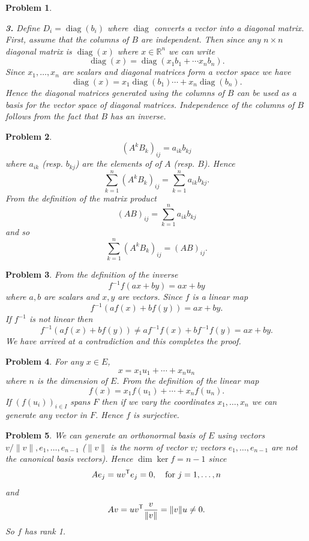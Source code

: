 \documentclass{article}
\newcommand{\subno}[1]{\par\noindent\textbf{#1}}
\theoremstyle{pprop}
\newtheorem{problem}{Problem}[section]
\begin{document}
\begin{problem}
$$$$
\subno{3.} Define $D_i=\operatorname*{diag}(b_i)$ where $\operatorname*{diag}$ converts a vector into a diagonal matrix. 
First, assume that the columns of $B$ are independent. Then since any $n \times n$ diagonal matrix is $\operatorname*{diag}(x)$ 
where $x \in \mathbb{R}^n$ we can write 
$$
\operatorname*{diag}(x)=
\operatorname*{diag}(x_1b_1 + \cdots x_n b_n).
$$
Since $x_1,\ldots,x_n$ are scalars and diagonal matrices form a vector space we have
$$
\operatorname*{diag}(x)=
x_1\operatorname*{diag}(b_1)
\cdots +  x_n \operatorname*{diag}(b_n).
$$
Hence the diagonal matrices generated using the columns of $B$ can be used as a basis for the vector space of diagonal matrices. 
Independence of the columns of $B$ follows from the fact that $B$ has an inverse.
\end{problem}
\begin{problem}
$$
(A^kB_k)_{ij}= a_{ik} b_{kj} 
$$
where $a_{ik}$ (resp. $b_{kj}$) are the elements of of $A$ (resp. $B$). Hence
$$
\sum_{k=1}^n (A^kB_k)_{ij} = \sum_{k=1}^n a_{ik} b_{kj} .
$$ 
From the definition of the matrix product
$$
(AB)_{ij}= \sum_{k=1}^n a_{ik} b_{kj} 
$$
and so
$$
\sum_{k=1}^n (A^kB_k)_{ij} = (AB)_{ij}.
$$  
\end{problem}
\begin{problem}
From the definition of the inverse
$$
f^{-1}f (ax+by)=ax+by
$$
where $a,b$ are scalars and $x,y$ are vectors. Since $f$ is a linear map
$$
f^{-1}(af(x)+bf(y))=ax+by.
$$
If $f^{-1}$ is not linear then 
$$
f^{-1}(af(x)+bf(y)) \neq a f^{-1}f(x)+ b f^{-1}f(y)=ax+by.
$$
We have arrived at a contradiction and this completes the proof.  
\end{problem}
\begin{problem}
For any $x \in E$,
$$
x = x_1 u_1 + \cdots + x_n u_n
$$
where $n$ is the dimension of $E$. From the definition of the linear map
$$
f(x)=x_1 f(u_1) + \cdots + x_n f(u_n).
$$
If $(f(u_i))_{i \in I}$ spans $F$ then if we vary the coordinates $x_1,\ldots,x_n$ we can generate any vector in $F$. 
Hence $f$ is surjective.  
\end{problem}
\begin{problem}
We can generate an orthonormal basis of $E$ using vectors $v/\lVert v\rVert,e_1,\ldots,e_{n-1}$ ($\lVert v\rVert$ is the norm of vector $v$; vectors $e_1,\ldots,e_{n-1}$ are not the canonical basis vectors). Hence $\dim\ker f=n-1$ since
$$
A e_j = u v^{\sf T} e_j=0, \quad \text{for $j=1,\ldots,n$}
$$
and
$$
A v = u v^{\sf T} \frac{v}{\lVert v \rVert}=\lVert v \rVert u \neq 0.
$$
So $f$ has rank 1.  
\end{problem}
\end{document}
